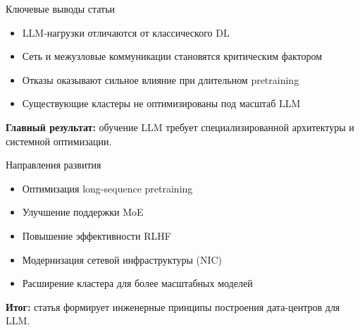 \begin{frame}{Ключевые выводы статьи}
	\begin{itemize}
		\item LLM-нагрузки отличаются от классического DL
		\item Сеть и межузловые коммуникации становятся критическим фактором
		\item Отказы оказывают сильное влияние при длительном pretraining
		\item Существующие кластеры не оптимизированы под масштаб LLM
	\end{itemize}
		
	\vspace{0.3cm}
	\textbf{Главный результат:} обучение LLM требует специализированной
	архитектуры и системной оптимизации.
\end{frame}
	
\begin{frame}{Направления развития}
	\begin{itemize}
		\item Оптимизация long-sequence pretraining
		\item Улучшение поддержки MoE
		\item Повышение эффективности RLHF
		\item Модернизация сетевой инфраструктуры (NIC)
		\item Расширение кластера для более масштабных моделей
	\end{itemize}
		
	\vspace{0.3cm}
	\textbf{Итог:} статья формирует инженерные принципы построения
	дата-центров для LLM.
\end{frame}
	


